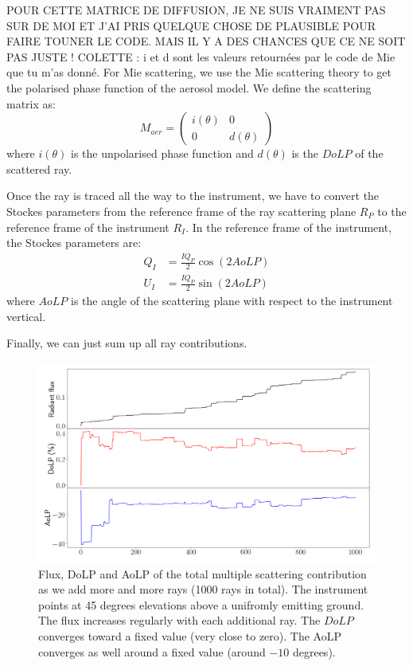 \documentclass{article}
\begin{document}
POUR CETTE MATRICE DE DIFFUSION, JE NE SUIS VRAIMENT PAS SUR DE MOI ET J'AI PRIS QUELQUE CHOSE DE PLAUSIBLE POUR FAIRE TOUNER LE CODE. MAIS IL Y A DES CHANCES QUE CE NE SOIT PAS JUSTE !
COLETTE : i et d sont les valeurs retournées par le code de Mie que tu m'as donné.
For Mie scattering, we use the Mie scattering theory to get the polarised phase function of the aerosol model. We define the scattering matrix as:
\begin{equation}
  M_{aer} = \begin{pmatrix}
  i(\theta) & 0\\
  0 & d(\theta)
  \end{pmatrix}
\end{equation}
where $i(\theta)$ is the unpolarised phase function and $d(\theta)$ is the $DoLP$ of the scattered ray.


Once the ray is traced all the way to the instrument, we have to convert the Stockes parameters from the reference frame of the ray scattering plane $R_P$ to the reference frame of the instrument $R_I$.
In the reference frame of the instrument, the Stockes parameters are:
\begin{align}
Q_I &= \frac{I  Q_P}{2} \cos(2  AoLP) \\
U_I &= \frac{I  Q_P}{2} \sin(2  AoLP)
\end{align}
where $AoLP$ is the angle of the scattering plane with respect to the instrument vertical.

Finally, we can just sum up all ray contributions.

\begin{figure}
  \includegraphics[width=\textwidth]{MS_cumulative_contribution.png}
  \caption{Flux, DoLP and AoLP of the total multiple scattering contribution as we add more and more rays (1000 rays in total). The instrument points at 45 degrees elevations above a unifromly emitting ground. The flux increases regularly with each additional ray. The $DoLP$ converges toward a fixed value (very close to zero). The AoLP converges as well around a fixed value (around $-10$ degrees). }
\end{figure}










\end{document}
